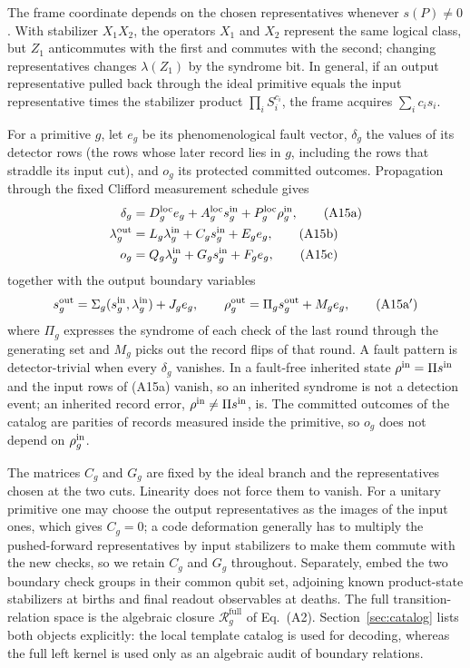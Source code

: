 \documentclass[aps,prx,reprint,superscriptaddress,nofootinbib,floatfix,longbibliography]{revtex4-2}
\theoremstyle{definition}
\begin{document}
The frame coordinate depends on the chosen representatives whenever
$s(P)\neq0$.  With stabilizer $X_1X_2$, the operators $X_1$ and $X_2$
represent the same logical class, but $Z_1$ anticommutes with the first and
commutes with the second; changing representatives changes $\lambda(Z_1)$ by
the syndrome bit.  In general, if an output representative pulled back
through the ideal primitive equals the input representative times the
stabilizer product $\prod_iS_i^{c_i}$, the frame acquires $\sum_ic_is_i$.

For a primitive $g$, let $e_g$ be its phenomenological fault vector, $\delta_g$
the values of its detector rows (the rows whose later record lies in $g$,
including the rows that straddle its input cut), and $o_g$ its protected
committed outcomes.  Propagation through the fixed Clifford measurement
schedule gives
\begin{align}
 \delta_g&=D_g^{\mathrm{loc}}e_g+A_g^{\mathrm{loc}}s_g^{\rm in}
   +P_g^{\mathrm{loc}}\rho_g^{\rm in},                                  \tag{A15a}\\
 \lambda_g^{\rm out}&=L_g\lambda_g^{\rm in}+C_gs_g^{\rm in}+E_ge_g,             \tag{A15b}\\
 o_g&=Q_g\lambda_g^{\rm in}+G_gs_g^{\rm in}+F_ge_g,                             \tag{A15c}
\end{align}
together with the output boundary variables
\begin{equation}
 s_g^{\rm out}=\Sigma_g(s_g^{\rm in},\lambda_g^{\rm in})+J_ge_g,\qquad
 \rho_g^{\rm out}=\Pi_gs_g^{\rm out}+M_ge_g,                           \tag{A15a$'$}
\end{equation}
where $\Pi_g$ expresses the syndrome of each check of the last round through
the generating set and $M_g$ picks out the record flips of that round.  A
fault pattern is detector-trivial when every $\delta_g$ vanishes.  In a
fault-free inherited state $\rho^{\rm in}=\Pi s^{\rm in}$ and the input rows
of (A15a) vanish, so an inherited syndrome is not a detection event; an
inherited record error, $\rho^{\rm in}\neq\Pi s^{\rm in}$, is.  The committed
outcomes of the catalog are parities of records measured inside the primitive,
so $o_g$ does not depend on $\rho_g^{\rm in}$.

The matrices $C_g$ and $G_g$ are fixed by the ideal branch and the
representatives chosen at the two cuts.  Linearity does not force them to
vanish.  For a unitary primitive one may choose the output representatives as
the images of the input ones, which gives $C_g=0$; a code deformation
generally has to multiply the pushed-forward representatives by input
stabilizers to make them commute with the new checks, so we retain $C_g$ and
$G_g$ throughout.  Separately, embed the two boundary check groups in their
common qubit set, adjoining known product-state stabilizers at births and
final readout observables at deaths.  The full transition-relation space is
the algebraic closure $\mathcal R_g^{\mathrm{full}}$ of Eq.~(A2).  Section~\ref{sec:catalog}
lists both objects
explicitly: the local template catalog is used for decoding, whereas the full
left kernel is used only as an algebraic audit of boundary relations.
\end{document}
